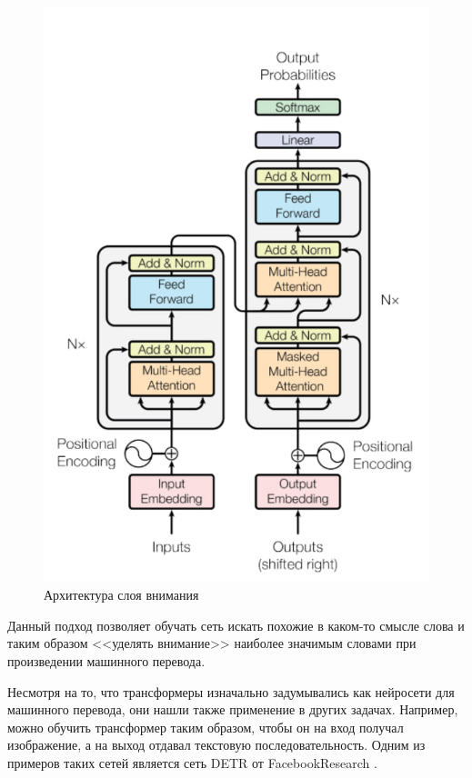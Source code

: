 \begin{figure}[ht!] 
	\center
	\includegraphics [scale=0.6] {my_folder/images/transformer}
	\caption{Архитектура слоя внимания} 
	\label{fig:attention}
\end{figure}

Данный подход позволяет обучать сеть искать похожие в каком-то смысле слова и таким образом <<уделять внимание>> наиболее значимым словами при произведении машинного перевода. 

Несмотря на то, что трансформеры изначально задумывались как нейросети для машинного перевода, они нашли также применение в других задачах. Например, можно обучить трансформер таким образом, чтобы он на вход получал изображение, а на выход отдавал текстовую последовательность.
Одним из примеров таких сетей является сеть DETR от FacebookResearch \cite{detr}.

